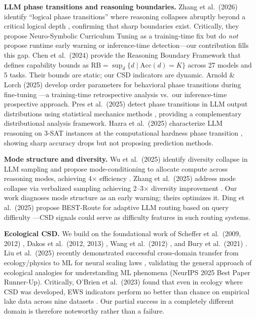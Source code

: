 \documentclass[11pt,letterpaper]{article}
\begin{document}
\textbf{LLM phase transitions and reasoning boundaries.} Zhang et al.~(2026) identify ``logical phase transitions'' where reasoning collapses abruptly beyond a critical logical depth \cite{zhang2026logical}, confirming that sharp boundaries exist. Critically, they propose Neuro-Symbolic Curriculum Tuning as a training-time fix but do \emph{not} propose runtime early warning or inference-time detection---our contribution fills this gap. Chen et al.~(2024) provide the Reasoning Boundary Framework \cite{chen2024reasoning} that defines capability bounds as $\text{RB} = \sup_d\{d \mid \text{Acc}(d) = K\}$ across 27 models and 5 tasks. Their bounds are static; our CSD indicators are dynamic. Arnold \& Lorch (2025) develop order parameters for behavioral phase transitions during fine-tuning \cite{arnold2025}---a training-time retrospective analysis vs.\ our inference-time prospective approach. Pres et al.~(2025) detect phase transitions in LLM output distributions using statistical mechanics methods \cite{pres2025phase}, providing a complementary distributional analysis framework. Hazra et al.~(2025) characterize LLM reasoning on 3-SAT instances at the computational hardness phase transition \cite{hazra2025}, showing sharp accuracy drops but not proposing prediction methods.

\textbf{Mode structure and diversity.} Wu et al.~(2025) identify diversity collapse in LLM sampling and propose mode-conditioning to allocate compute across reasoning modes, achieving 4$\times$ efficiency \cite{wu2025modec}. Zhang et al.~(2025) address mode collapse via verbalized sampling achieving 2--3$\times$ diversity improvement \cite{zhang2025verbalized}. Our work diagnoses mode structure as an early warning; theirs optimizes it. Ding et al.~(2025) propose BEST-Route for adaptive LLM routing based on query difficulty \cite{ding2025bestroute}---CSD signals could serve as difficulty features in such routing systems.

\textbf{Ecological CSD.} We build on the foundational work of Scheffer et al.~(2009, 2012) \cite{scheffer2009, scheffer2012}, Dakos et al.~(2012, 2013) \cite{dakos2012methods, dakos2013}, Wang et al.~(2012) \cite{wang2012flickering}, and Bury et al.~(2021) \cite{bury2021}. Liu et al.~(2025) recently demonstrated successful cross-domain transfer from ecology/physics to ML for neural scaling laws \cite{liu2025superposition}, validating the general approach of ecological analogies for understanding ML phenomena (NeurIPS 2025 Best Paper Runner-Up). Critically, O'Brien et al.~(2023) found that even in ecology where CSD was developed, EWS indicators perform no better than chance on empirical lake data across nine datasets \cite{obrien2023}. Our partial success in a completely different domain is therefore noteworthy rather than a failure.
\end{document}

